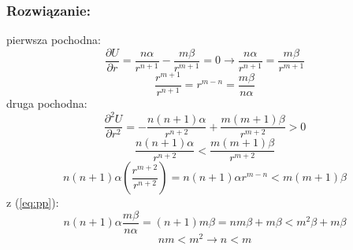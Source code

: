 \subsubsection*{Rozwiązanie:}
pierwsza pochodna:
\begin{equation}
\frac{\partial U}{\partial r} = \frac{n\alpha}{r^{n+1}} - \frac{m\beta}{r^{m+1}}=0 \rightarrow \frac{n\alpha}{r^{n+1}} = \frac{m\beta}{r^{m+1}}
\end{equation}
\begin{equation}
\label{eq:pp}
\frac{r^{m+1}}{r^{n+1}} = r^{m-n} = \frac{m\beta}{n\alpha}
\end{equation}
druga pochodna:
\begin{equation}
\frac{\partial^2 U}{\partial r^2} = - \frac{n(n+1)\alpha}{r^{n+2}} + \frac{m(m+1)\beta}{r^{m+2}} > 0
\end{equation}
\[ \frac{n(n+1)\alpha}{r^{n+2}} < \frac{m(m+1)\beta}{r^{m+2}} \]
\[n(n+1)\alpha \left( \frac{r^{m+2}}{r^{n+2}} \right) = n(n+1)\alpha r^{m-n} < m(m+1)\beta\]
z (\ref{eq:pp}):
\[ n(n+1)\alpha \frac{m\beta}{n\alpha} = (n+1)m\beta = nm\beta + m\beta < m^2\beta + m\beta\]
\[nm < m^2 \rightarrow n<m\]
\hrulefill
